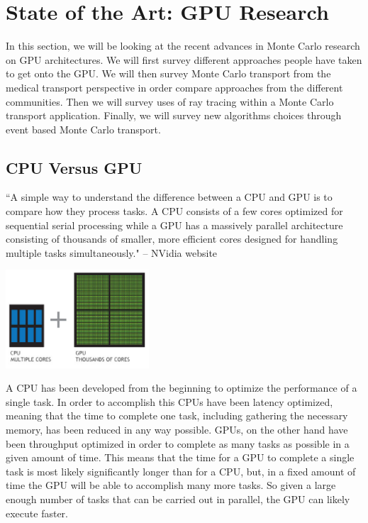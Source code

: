 \section{ \textbf{State of the Art: GPU Research} }
\label{sec:SOTAGPU}

In this section, we will be looking at the recent advances in Monte Carlo research on GPU architectures.
%
We will first survey different approaches people have taken to get onto the GPU.
%
We will then survey Monte Carlo transport from the medical transport perspective in order compare approaches from the different communities.
%
Then we will survey uses of ray tracing within a Monte Carlo transport application.
%
Finally, we will survey new algorithms choices through event based Monte Carlo transport.
%

%
\subsection{\textbf{ CPU Versus GPU} }

``A simple way to understand the difference between a CPU and GPU is to compare how they process tasks. A CPU consists of a few cores optimized for sequential serial processing while a GPU has a massively parallel architecture consisting of thousands of smaller, more efficient cores designed for handling multiple tasks simultaneously." -- NVidia website~\cite{CPUvGPUnvidia}

\includegraphics[width=0.4\textwidth]{cpu-and-gpu.jpg}~\cite{CPUvGPUnvidia}

A CPU has been developed from the beginning to optimize the performance of a single task. 
%
In order to accomplish this CPUs have been latency optimized, meaning that the time to complete one task, including gathering the necessary memory, has been reduced in any way possible.
%
GPUs, on the other hand have been throughput optimized in order to complete as many tasks as possible in a given amount of time.
%
This means that the time for a GPU to complete a single task is most likely significantly longer than for a CPU, but, in a fixed amount of time the GPU will be able to accomplish many more tasks.
%
So given a large enough number of tasks that can be carried out in parallel, the GPU can likely execute faster.


